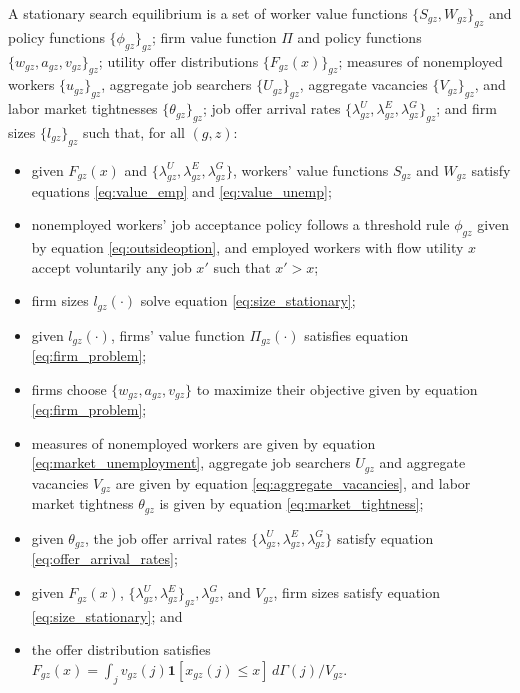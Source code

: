 \begin{definition}
    A stationary search equilibrium is a set of worker value functions $\{S_{gz}, W_{gz}\}_{gz}$ and policy functions $\{ \phi_{gz} \}_{gz}$; firm value function $\Pi$ and policy functions $\{w_{gz}, a_{gz}, v_{gz}\}_{gz}$; utility offer distributions $\{F_{gz}(x)\}_{gz}$; measures of nonemployed workers $\{u_{gz}\}_{gz}$, aggregate job searchers $\{U_{gz}\}_{gz}$, aggregate vacancies $\{V_{gz}\}_{gz}$, and labor market tightnesses $\{\theta_{gz}\}_{gz}$; job offer arrival rates $\{\lambda_{gz}^{U}, \lambda_{gz}^{E}, \lambda_{gz}^G\}_{gz}$; and firm sizes $\{l_{gz}\}_{gz}$ such that, for all $(g, z)$:
    \begin{itemize}
        \item given $F_{gz}(x)$ and $\{\lambda_{gz}^{U}, \lambda_{gz}^{E}, \lambda_{gz}^{G}\}$, workers' value functions $S_{gz}$ and $W_{gz}$ satisfy equations \eqref{eq:value_emp} and \eqref{eq:value_unemp};
        \item nonemployed workers' job acceptance policy follows a threshold rule $\phi_{gz}$ given by equation \eqref{eq:outsideoption}, and employed workers with flow utility $x$ accept voluntarily any job $x'$ such that $x' > x$;
        \item firm sizes $l_{gz}(\cdot)$ solve equation \eqref{eq:size_stationary};
        \item given $l_{gz}(\cdot)$, firms' value function $\Pi_{gz}(\cdot)$ satisfies equation \eqref{eq:firm_problem};
        \item firms choose $\{w_{gz}, a_{gz}, v_{gz}\}$ to maximize their objective given by equation \eqref{eq:firm_problem};
        \item measures of nonemployed workers are given by equation \eqref{eq:market_unemployment}, aggregate job searchers $U_{gz}$ and aggregate vacancies $V_{gz}$ are given by equation \eqref{eq:aggregate_vacancies}, and labor market tightness $\theta_{gz}$ is given by equation \eqref{eq:market_tightness};
        \item given $\theta_{gz}$, the job offer arrival rates $\{\lambda_{gz}^{U}, \lambda_{gz}^{E}, \lambda_{gz}^{G}\}$ satisfy equation \eqref{eq:offer_arrival_rates};
        \item given $F_{gz}(x)$, $\{\lambda_{gz}^{U}, \lambda_{gz}^{E}\}_{gz}, \lambda_{gz}^{G}$, and $V_{gz}$, firm sizes satisfy equation \eqref{eq:size_stationary}; and
        \item the offer distribution satisfies $F_{gz}(x) = \int_{j} v_{gz}(j) \mathbf{1}[x_{gz}(j) \leq x] \, d\Gamma(j) / V_{gz}$.
    \end{itemize}
\end{definition}


